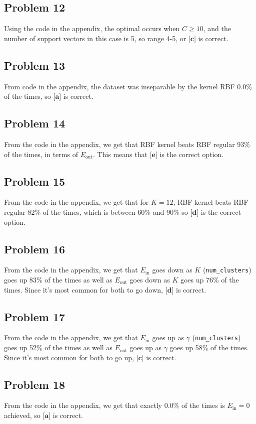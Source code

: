 \documentclass{article}
\begin{document}
\subsection*{Problem 12}
Using the code in the appendix, the optimal occurs when $C \geq 10$, and the number of support vectors in this case is 5, so range 4-5, or $\textbf{[c]}$ is correct.
\subsection*{Problem 13}
From code in the appendix, the dataset was inseparable by the kernel RBF $0.0\%$ of the times, so $\textbf{[a]}$ is correct.
\subsection*{Problem 14}
From the code in the appendix, we get that RBF kernel beats RBF regular 93\% of the times, in terms of $E_{\text{out}}$. This means that $\textbf{[e]}$ is the correct option.
\subsection*{Problem 15}
From the code in the appendix, we get that for $K = 12$, RBF kernel beats RBF regular 82\% of the times, which is between 60\% and 90\% so $\textbf{[d]}$ is the correct option.
\subsection*{Problem 16}
From the code in the appendix, we get that $E_{\text{in}}$ goes down as $K$ (\verb|num_clusters|) goes up 83\% of the times as well as $E_{\text{out}}$ goes down as $K$ goes up 76\% of the times. Since it's most common for both to go down, $\textbf{[d]}$ is correct.
\subsection*{Problem 17}
From the code in the appendix, we get that $E_{\text{in}}$ goes up as $\gamma$ (\verb|num_clusters|) goes up 52\% of the times as well as $E_{\text{out}}$ goes up as $\gamma$ goes up 58\% of the times. Since it's most common for both to go up, $\textbf{[c]}$ is correct.
\subsection*{Problem 18}
From the code in the appendix, we get that exactly $0.0\%$ of the times is $E_{\text{in}} = 0$ achieved, so $\textbf{[a]}$ is correct.
\end{document}
